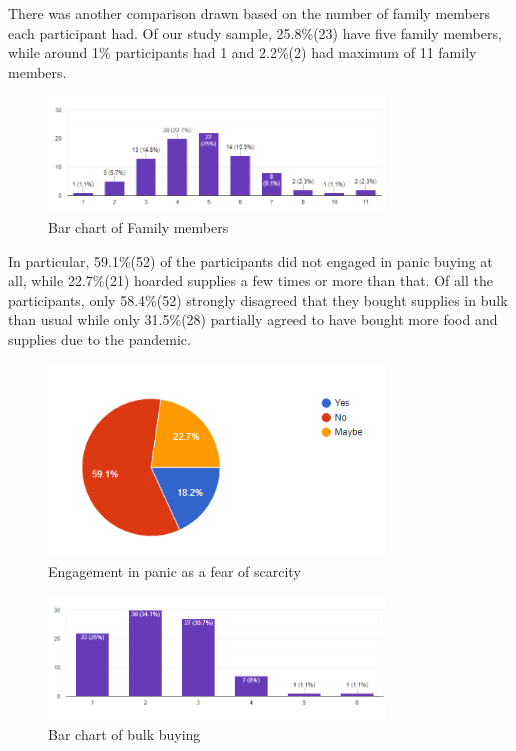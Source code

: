 \documentclass[runningheads]{llncs}
\begin{document}
There was another comparison drawn based on the number of family members each participant had. Of our study sample, 25.8\%(23) have five family members, while around 1\% participants had 1 and 2.2\%(2) had maximum of 11 family members. 
\begin{figure}[H]
    \centering
  \includegraphics[width=0.8\textwidth]{graphs/family_members.PNG}
    \caption{Bar chart of Family members}
\end{figure}
In particular, 59.1\%(52) of the participants did not engaged in panic buying at all, while 22.7\%(21) hoarded supplies a few times or more than that. Of all the participants, only 58.4\%(52) strongly disagreed that they bought supplies in bulk than usual while only 31.5\%(28) partially agreed to have bought more food and supplies due to the pandemic.
\begin{figure}[H]
    \centering
  \includegraphics[width=0.8\textwidth]{graphs/grocery.PNG}
    \caption{Engagement in panic as a fear of scarcity}
\end{figure}
\begin{figure}[H]
    \centering
  \includegraphics[width=0.8\textwidth]{graphs/bulk.PNG}
    \caption{Bar chart of bulk buying}
\end{figure}
\end{document}
